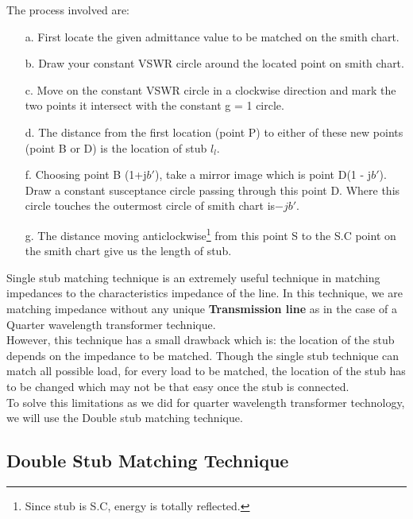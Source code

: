 The process involved are:\\
\begin{itemize}
	\item[a.]First locate the given admittance value to be matched on the smith chart.
	\item[b.]Draw your constant VSWR circle  around the located point on smith chart.
	\item[c.] Move on the constant VSWR circle in a clockwise direction and mark the two points it intersect with the constant g = 1 circle.
	\item[d.]The distance from the first location (point P) to either of these new points (point B or D) is the location of stub $l_l$.
	\item[f.] Choosing point B (1+j$b'$), take a mirror image which is point D(1 - j$b'$). Draw a constant susceptance circle passing through this point D. Where this circle touches the outermost circle of smith chart is$ -jb'$.
	\item[g.] The distance moving anticlockwise\footnote{Since stub is S.C, energy is totally reflected.} from this point S to the S.C point on the smith chart give us the length of stub.
\end{itemize}

Single stub matching technique is an extremely useful technique in matching impedances to the characteristics impedance of the line. In this technique, we are matching impedance without any unique \textbf{Transmission line} as in the case of a Quarter wavelength transformer technique.\\

However, this technique has a small drawback which is: the location of the stub  depends on the impedance to be matched. Though the single stub technique can match all possible load, for every load to be matched, the location of the stub has to be changed which may not be that easy once the stub is connected.\\

To solve this limitations as we did for quarter wavelength transformer technology, we will use the Double stub matching technique.
\subsection{Double Stub Matching Technique}

